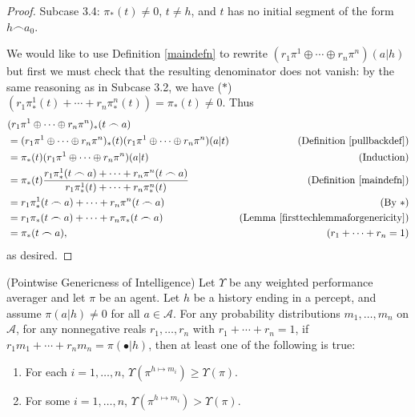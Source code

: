 \documentclass[runningheads]{llncs}
\begin{document}
\begin{proof}
    Subcase 3.4: $\pi_*(t)\not=0$, $t\not=h$, and $t$ has no initial segment
        of the form $h\frown a_0$.

    We would like to use Definition \ref{maindefn} to rewrite
    $(r_1\pi^1\oplus\cdots\oplus r_n\pi^n)(a|h)$ but first we must
    check that the resulting denominator does not vanish:
    by the same reasoning as in Subcase 3.2, we have
    ($*$) $(r_1\pi^1_*(t)+\cdots+r_n\pi^n_*(t))=\pi_*(t)\not=0$.
    Thus
    \begin{align*}
        &{} (r_1\pi^1\oplus\cdots\oplus r_n\pi^n)_*(t\frown a)\\
            &= (r_1\pi^1\oplus\cdots\oplus r_n\pi^n)_*(t)
                (r_1\pi^1\oplus\cdots\oplus r_n\pi^n)(a|t)
                    &\mbox{(Definition \ref{pullbackdef})}\\
            &= \pi_*(t)(r_1\pi^1\oplus\cdots\oplus r_n\pi^n)(a|t)
                    &\mbox{(Induction)}\\
            &= \pi_*(t)\frac{r_1\pi^1_*(t\frown a)+\cdots+r_n\pi^n(t\frown a)}
                {r_1\pi^1_*(t)+\cdots+r_n\pi^n_*(t)}
                    &\mbox{(Definition \ref{maindefn})}\\
            &= r_1\pi^1_*(t\frown a)+\cdots+r_n\pi^n(t\frown a)
                    &\mbox{(By $*$)}\\
            &= r_1\pi_*(t\frown a)+\cdots+r_n\pi_*(t\frown a)
                    &\mbox{(Lemma \ref{firsttechlemmaforgenericity})}\\
            &= \pi_*(t\frown a),
                    &\mbox{($r_1+\cdots+r_n=1$)}
    \end{align*}
    as desired.
\end{proof}

\begin{theorem}
    (Pointwise Genericness of Intelligence)
    Let $\Upsilon$ be any weighted performance averager and let
    $\pi$ be an agent.
    Let $h$ be a history ending in a percept, and assume
    $\pi(a|h)\not=0$ for all $a\in\mathcal A$.
    For any probability distributions $m_1,\ldots,m_n$ on $\mathcal A$,
    for any nonnegative reals $r_1,\ldots,r_n$ with $r_1+\cdots+r_n=1$,
    if $r_1m_1+\cdots+r_nm_n=\pi(\bullet|h)$,
    then at least one of the following is true:
    \begin{enumerate}
        \item For each $i=1,\ldots,n$, $\Upsilon(\pi^{h\mapsto m_i})\geq \Upsilon(\pi)$.
        \item For some $i=1,\ldots,n$, $\Upsilon(\pi^{h\mapsto m_i})>\Upsilon(\pi)$.
    \end{enumerate}
\end{theorem}
\end{document}
